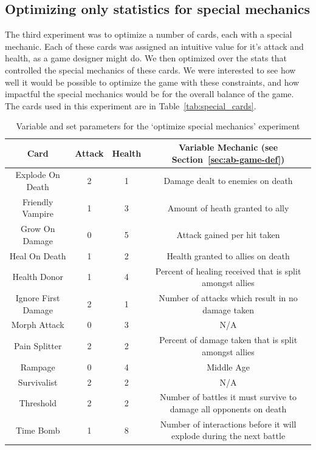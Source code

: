  \subsection{Optimizing only statistics for special mechanics}

The third experiment was to optimize a number of cards, each with a special mechanic. Each of these cards was assigned an intuitive value for it's attack and health, as a game designer might do. We then optimized over the stats that controlled the special mechanics of these cards. We were interested to see how well it would be possible to optimize the game with these constraints, and how impactful the special mechanics would be for the overall balance of the game. The cards used in this experiment are in Table~\ref{tab:special_cards}.

\begin{table}[t]
\centering
\begin{tabular}{||c c c c||} 
 \hline
 Card & Attack & Health & Variable Mechanic (see Section~\ref{sec:ab-game-def})\\ [0.5ex] 
 \hline\hline
 Explode On Death & 2 & 1 & Damage dealt to enemies on death \\ 
 \hline
 Friendly Vampire & 1 & 3 & Amount of heath granted to ally \\
 \hline
 Grow On Damage & 0 & 5 & Attack gained per hit taken \\
 \hline
 Heal On Death & 1 & 2 & Health granted to allies on death \\
 \hline
 Health Donor & 1 & 4 & Percent of healing received that is split amongst allies \\
 \hline
 Ignore First Damage & 2 & 1 & Number of attacks which result in no damage taken \\
 \hline
 Morph Attack & 0 & 3 & N/A \\
 \hline
 Pain Splitter & 2 & 2 & Percent of damage taken that is split amongst allies \\
 \hline
 Rampage & 0 & 4 & Middle Age  \\
 \hline
 Survivalist & 2 & 2 & N/A \\
 \hline
 Threshold & 2 & 2 & Number of battles it must survive to damage all opponents on death \\
 \hline
 Time Bomb & 1 & 8 & Number of interactions before it will explode during the next battle \\ 
 \hline
\end{tabular}
\caption{Variable and set parameters for the `optimize special mechanics' experiment}
\label{tab:group_vs_rr_params}
\end{table}


